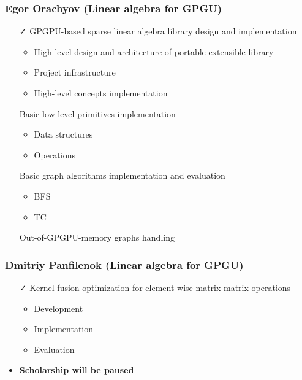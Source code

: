 \documentclass[xcolor=table,aspectratio=169]{beamer}
\begin{document}
\begin{frame}[fragile]
  \frametitle{Egor Orachyov (Linear algebra for GPGU)}
  \begin{minipage}[t]{0.48\textwidth}
    \begin{itemize}
      \item[\faCheck] GPGPU-based sparse linear algebra library design and implementation 
      \begin{itemize}
        \item High-level design and architecture of portable extensible library 
        \item Project infrastructure
        \item High-level concepts implementation
      \end{itemize}
    \end{itemize}
  \end{minipage}
  \pause
  \begin{minipage}[t]{0.49\textwidth}
    \begin{itemize}
      \item[\faHourglassHalf] Basic low-level primitives implementation
      \begin{itemize}
        \item Data structures
        \item Operations
      \end{itemize}
      \item[\faHourglassHalf] Basic graph algorithms implementation and evaluation
      \begin{itemize}
        \item BFS
        \item TC
      \end{itemize}
      \item[\faHourglassHalf] Out-of-GPGPU-memory graphs handling
    \end{itemize}
  \end{minipage}
\end{frame}

\begin{frame}[fragile]
  \frametitle{Dmitriy Panfilenok (Linear algebra for GPGU)}
  \begin{minipage}[t]{0.48\textwidth}
    \begin{itemize}
      \item[\faCheck] Kernel fusion optimization for element-wise matrix-matrix operations
      \begin{itemize}
        \item Development
        \item Implementation
        \item Evaluation
      \end{itemize} 
    \end{itemize}
  \end{minipage}
  \pause
  \begin{minipage}[t]{0.48\textwidth}
    \begin{itemize}
      \item \textbf{Scholarship will be paused}
    \end{itemize}
  \end{minipage}
\end{frame}
\end{document}
